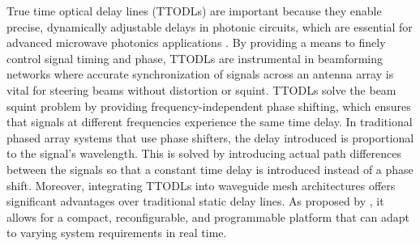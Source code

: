 True time optical delay lines (TTODLs) are important because they enable precise, dynamically adjustable delays in photonic circuits, which are essential for advanced microwave photonics applications \cite{lenz_optical_2001,xiang_low-loss_2018,zhu_silicon_2020}.
By providing a means to finely control signal timing and phase, TTODLs are instrumental in beamforming networks where accurate synchronization of signals across an antenna array is vital for steering beams without distortion or squint.
TTODLs solve the beam squint problem by providing frequency-independent phase shifting, which ensures that signals at different frequencies experience the same time delay.
In traditional phased array systems that use phase shifters, the delay introduced is proportional to the signal's wavelength.
This is solved by introducing actual path differences between the signals so that a constant time delay is introduced instead of a phase shift.
Moreover, integrating TTODLs into waveguide mesh architectures offers significant advantages over traditional static delay lines.
As proposed by \cite{perez-lopez_programmable_2018}, it allows for a compact, reconfigurable, and programmable platform that can adapt to varying system requirements in real time.

